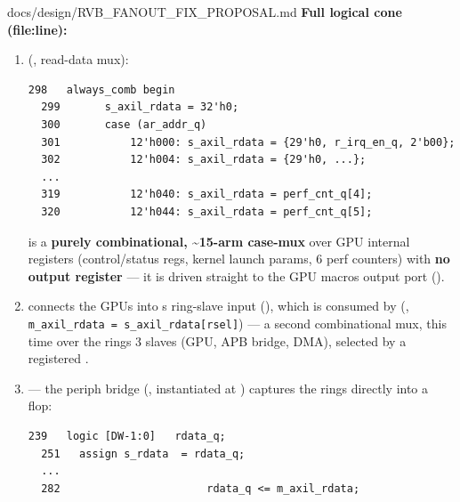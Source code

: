 \begin{relocated}{docs/design/RVB_FANOUT_FIX_PROPOSAL.md}
\textbf{Full logical cone (file:line):}

\begin{enumerate}
\def\labelenumi{\arabic{enumi}.}
\item
   (, read-data mux):

  \begin{lstlisting}[language={}]
  298   always_comb begin
  299       s_axil_rdata = 32'h0;
  300       case (ar_addr_q)
  301           12'h000: s_axil_rdata = {29'h0, r_irq_en_q, 2'b00};
  302           12'h004: s_axil_rdata = {29'h0, ...};
  ...
  319           12'h040: s_axil_rdata = perf_cnt_q[4];
  320           12'h044: s_axil_rdata = perf_cnt_q[5];
  \end{lstlisting}

   is a \textbf{purely combinational,
  \textasciitilde15-arm case-mux} over GPU internal registers
  (control/\allowbreak{}status regs, kernel launch params, 6 perf
  counters) with \textbf{no output register} --- it is driven straight
  to the GPU macro\textquotesingle s  output port
  ().
\item
   connects the GPU\textquotesingle s
   into
  \textquotesingle s ring-slave input
  (), which is consumed by
   (,
  \texttt{m\_\allowbreak{}axil\_\allowbreak{}rdata\ =\allowbreak{}\ s\_\allowbreak{}axil\_\allowbreak{}rdata[rsel]})
  --- a second combinational mux, this time over the
  ring\textquotesingle s 3 slaves (GPU, APB bridge, DMA), selected by a
  registered .
\item
   --- the periph
  bridge (, instantiated at
  ) captures the ring\textquotesingle s
   directly into a flop:

  \begin{lstlisting}[language={}]
  239   logic [DW-1:0]   rdata_q;
  251   assign s_rdata  = rdata_q;
  ...
  282                       rdata_q <= m_axil_rdata;
  \end{lstlisting}
\end{enumerate}


\end{relocated}
